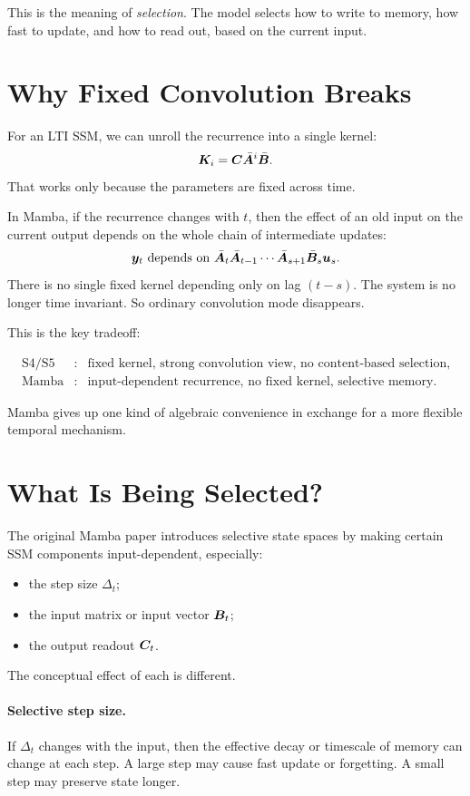 This is the meaning of \emph{selection}. The model selects how to write to memory, how
fast to update, and how to read out, based on the current input.

\section{Why Fixed Convolution Breaks}

For an LTI SSM, we can unroll the recurrence into a single kernel:
\[
  \bm{K}_i = \bm{C}\bar{\bm{A}}^i\bar{\bm{B}}.
\]
That works only because the parameters are fixed across time.

In Mamba, if the recurrence changes with $t$, then the effect of an old input on the
current output depends on the whole chain of intermediate updates:
\[
  \bm{y}_t
  \text{ depends on }
  \bar{\bm{A}}_t \bar{\bm{A}}_{t-1}\cdots \bar{\bm{A}}_{s+1}
  \bar{\bm{B}}_s \bm{u}_s.
\]
There is no single fixed kernel depending only on lag $(t-s)$. The system is no longer
time invariant. So ordinary convolution mode disappears.

This is the key tradeoff:

\[
\begin{array}{lll}
\text{S4/S5} &:& \text{fixed kernel, strong convolution view, no content-based selection}, \\
\text{Mamba} &:& \text{input-dependent recurrence, no fixed kernel, selective memory}.
\end{array}
\]

Mamba gives up one kind of algebraic convenience in exchange for a more flexible temporal
mechanism.

\section{What Is Being Selected?}

The original Mamba paper introduces selective state spaces by making certain SSM
components input-dependent, especially:

\begin{itemize}
  \item the step size $\Delta_t$;
  \item the input matrix or input vector $\bm{B}_t$;
  \item the output readout $\bm{C}_t$.
\end{itemize}

The conceptual effect of each is different.

\paragraph{Selective step size.}
If $\Delta_t$ changes with the input, then the effective decay or timescale of memory can
change at each step. A large step may cause fast update or forgetting. A small step may
preserve state longer.

